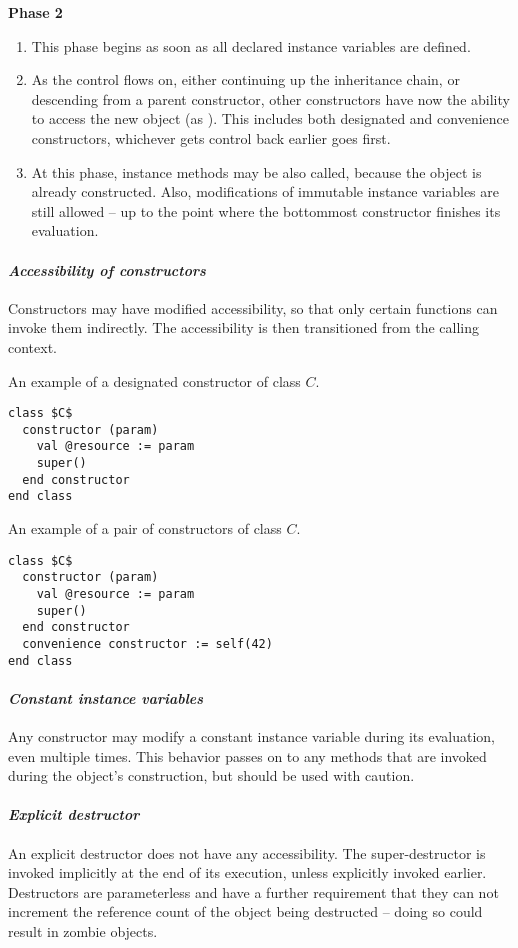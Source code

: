 {\bfseries Phase 2}
\begin{enumerate}
  \item This phase begins as soon as all declared instance variables are defined.
  \item As the control flows on, either continuing up the inheritance chain, or descending from a parent constructor, other constructors have now the ability to access the new object (as ). This includes both designated and convenience constructors, whichever gets control back earlier goes first. 
  \item At this phase, instance methods may be also called, because the object is already constructed. Also, modifications of immutable instance variables are still allowed -- up to the point where the bottommost constructor finishes its evaluation. 
\end{enumerate}

\paragraph{\em Accessibility of constructors}
Constructors may have modified accessibility, so that only certain functions can invoke them indirectly. The accessibility is then transitioned from the calling context. 

\example An example of a designated constructor of class $C$.
\begin{lstlisting}
class $C$
  constructor (param)
    val @resource := param
    super()
  end constructor
end class
\end{lstlisting}

\example An example of a pair of constructors of class $C$. 
\begin{lstlisting}
class $C$
  constructor (param)
    val @resource := param
    super()
  end constructor
  convenience constructor := self(42)
end class
\end{lstlisting}

\paragraph{\em Constant instance variables}
Any constructor may modify a constant instance variable during its evaluation, even multiple times. This behavior passes on to any methods that are invoked during the object's construction, but should be used with caution. 

\paragraph{\em Explicit destructor}
An explicit destructor does not have any accessibility. The super-destructor is invoked implicitly at the end of its execution, unless explicitly invoked earlier. Destructors are parameterless and have a further requirement that they can not increment the reference count of the object being destructed -- doing so could result in zombie objects. 

